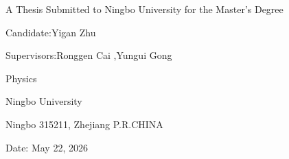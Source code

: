 \vspace*{2.8cm}

\begin{center}

{\Large A Thesis Submitted to Ningbo University for the Master's Degree\textbf{} \par}

\vspace{4em}


{\LARGE\bfseries \thesistitleEN{}\par}

\vspace{3.2cm}

{\large Candidate:\quad Yigan Zhu\par}
\vspace{0.8em}
{\large Supervisors:\quad Ronggen Cai ,\quad Yungui Gong \par}

\vspace{2.8cm}

{\large Physics\par}
\vspace{0.8em}
{\large Ningbo University\par}
\vspace{0.4em}
{\large Ningbo 315211, \qquad Zhejiang P.R.CHINA\par}

\vspace{2.2cm}

{\large Date: \quad  May 22, 2026 \quad {}\par}

\end{center}

\restoregeometry
